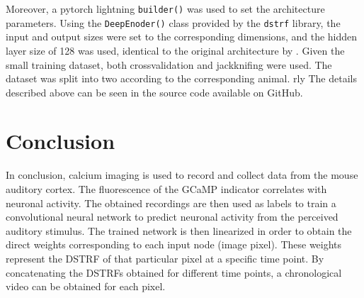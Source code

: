 Moreover, a pytorch lightning \verb|builder()| was used to set the architecture parameters. Using the \verb|DeepEnoder()| class provided by the \verb|dstrf| library, the input and output sizes were set to the corresponding dimensions, and the hidden layer size of 128 was used, identical to the original architecture by \cite{keshishianEstimatingInterpretingNonlinear2020}. Given the small training dataset, both crossvalidation and jackknifing were used. The dataset was split into two according to the corresponding animal.
rly
The details described above can be seen in the source code available on GitHub.

\section{Conclusion}
In conclusion, calcium imaging is used to record and collect data from the mouse auditory cortex. The fluorescence of the GCaMP indicator correlates with neuronal activity. The obtained recordings are then used as labels to train a convolutional neural network to predict neuronal activity from the perceived auditory stimulus. The trained network is then linearized in order to obtain the direct weights corresponding to each input node (image pixel). These weights represent the DSTRF of that particular pixel at a specific time point. By concatenating the DSTRFs obtained for different time points, a chronological video can be obtained for each pixel.
